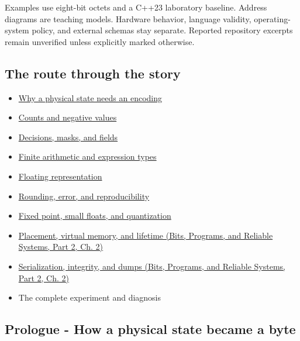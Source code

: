 Examples use eight-bit octets and a C++23 laboratory baseline. Address diagrams are teaching models. Hardware behavior, language validity, operating-system policy, and external schemas stay separate. Reported repository excerpts remain unverified unless explicitly marked otherwise.

\subsection{The route through the story}\label{01-foundations-i-ch001-the-route-through-the-story}

\hypertarget{01-foundations-i-ch001-the-route-through-the-story}{}

\begin{itemize}
\tightlist
\item
  \hyperref[01-foundations-i-ch001-prologue---how-a-physical-state-became-a-byte]{Why a physical state needs an encoding}
\item
  \hyperref[01-foundations-i-ch001-from-a-signal-to-an-interpretation]{Counts and negative values}
\item
  \hyperref[01-foundations-i-ch001-bits-become-decisions-and-compact-fields]{Decisions, masks, and fields}
\item
  \hyperref[01-foundations-i-ch001-arithmetic-becomes-a-policy]{Finite arithmetic and expression types}
\item
  \hyperref[01-foundations-i-ch001-a-stretching-ruler-for-real-valued-quantities]{Floating representation}
\item
  \hyperref[01-foundations-i-ch001-when-arithmetic-meets-uncertainty]{Rounding, error, and reproducibility}
\item
  \hyperref[01-foundations-i-ch001-choosing-what-information-to-keep]{Fixed point, small floats, and quantization}
\item
  \href{../01-Bits-Programs-and-Reliable-Systems-P02/main.pdf\#01-foundations-i-ch002-where-the-bytes-live}{Placement, virtual memory, and lifetime (Bits, Programs, and Reliable Systems, Part 2, Ch. 2)}
\item
  \href{../01-Bits-Programs-and-Reliable-Systems-P02/main.pdf\#01-foundations-i-ch002-bytes-become-a-durable-agreement}{Serialization, integrity, and dumps (Bits, Programs, and Reliable Systems, Part 2, Ch. 2)}
\item
  {The complete experiment and diagnosis}
\end{itemize}

\subsection{Prologue - How a physical state became a byte}\label{01-foundations-i-ch001-prologue---how-a-physical-state-became-a-byte}

